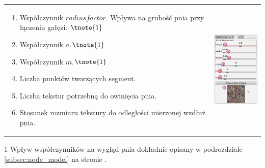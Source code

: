 \begin{threeparttable}

\begin{tabular}{lr}
\parbox[c]{95mm}{
\begin{enumerate}
	\item {Współczynnik $radius factor$. Wpływa na grubość pnia przy łączeniu gałęzi. $\tnote{1}$}
	\item {Współczynnik $a$.$\tnote{1}$}
	\item {Współczynnik $m$.$\tnote{1}$}
	\item {Liczba punktów tworzących segment.}
	\item {Liczba tekstur potrzebną do owinięcia pnia.}
	\item {Stosunek rozmiaru tekstury do odległości mierzonej wzdłuż pnia.}
\end{enumerate}
} &
\parbox[c]{35mm}{
\includegraphics[width=35mm]{images/gui/trunk_panel.png}
}\\
\end{tabular}
\begin{tablenotes}
	\item[1] Wpływ współczynników na wygląd pnia dokładnie opisany w podrozdziale \ref{subsec:node_model} na stronie \pageref{subsec:node_model}.
\end{tablenotes}

\end{threeparttable}

